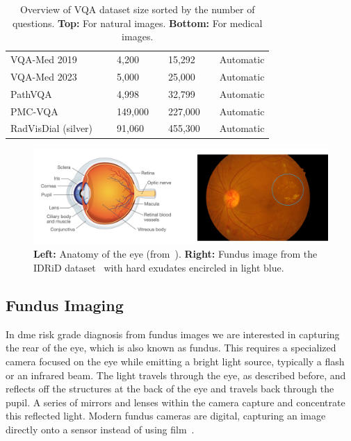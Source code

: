 \begin{table}[ht]
\begin{center}
\begin{tabular}{lp{0.5cm}lp{0.5cm}lp{0.5cm}l}
VQA-Med 2019~\cite{ImageCLEFVQA-Med2019}   && 4,200 &&  15,292 && Automatic \\ 
VQA-Med 2023~\cite{ImageCLEF2023}  && 5,000 && 25,000 && Automatic \\ 
PathVQA~\cite{he2020pathvqa}  && 4,998 && 32,799 && Automatic\\ 
PMC-VQA~\cite{zhang2023pmc}  && 149,000 && 227,000 && Automatic\\ 
RadVisDial (silver)~\cite{kovaleva2020towards}  && 91,060 && 455,300 &&  Automatic \\ \bottomrule
\end{tabular}
\end{center}
\caption{Overview of VQA dataset size sorted by the number of questions. \textbf{Top:} For natural images. \textbf{Bottom:} For medical images.}
\label{tab:datasets_vqa}
\end{table}

\begin{figure}[h]
\begin{center}
\includegraphics[width=\textwidth]{Figures/Background/anatomy_fundus.png}
\caption{\textbf{Left:} Anatomy of the eye (from~\cite{sightresearchukYourEyes}). \textbf{Right:} Fundus image from the IDRiD dataset~\cite{idrid} with hard exudates encircled in light blue.}
\label{fig:eye_anatomy}
\end{center}
\end{figure}

\subsection{Fundus Imaging}

In \gls{dme} risk grade diagnosis from fundus images we are interested in capturing the rear of the eye, which is also known as fundus. This requires a specialized camera focused on the eye while emitting a bright light source, typically a flash or an infrared beam. The light travels through the eye, as described before, and reflects off the structures at the back of the eye and travels back through the pupil. A series of mirrors and lenses within the camera capture and concentrate this reflected light.
Modern fundus cameras are digital, capturing an image directly onto a sensor instead of using film~\cite{bernardes2011digital}. 


